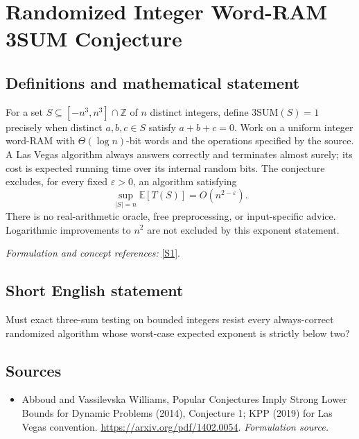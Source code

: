 \documentclass[11pt]{article}
\begin{document}
\section*{\texorpdfstring{Randomized Integer Word-RAM 3SUM Conjecture}{Randomized Integer Word-RAM 3SUM Conjecture}}\label{statement}
\subsection{Definitions and mathematical statement}
For a set $S\subseteq[-n^3,n^3]\cap{\mathbb{Z}}$ of $n$ distinct integers, define
$\mathrm{3SUM}(S)=1$ precisely when distinct $a,b,c\in S$ satisfy $a+b+c=0$. Work on a uniform integer word-RAM with $\Theta(\log n)$-bit words and the operations specified by the source. A Las Vegas algorithm always answers correctly and terminates almost surely; its cost is expected running time over its internal random bits. The conjecture excludes, for every fixed ${\varepsilon}>0$, an algorithm satisfying
\[
 \sup_{|S|=n}{\mathbb{E}}[T(S)]=O(n^{2-{\varepsilon}}).
\]
There is no real-arithmetic oracle, free preprocessing, or input-specific advice. Logarithmic improvements to $n^2$ are not excluded by this exponent statement.
\par\smallskip\textit{Formulation and concept references:} \href{https://arxiv.org/pdf/1402.0054}{[S1]}.

\subsection{Short English statement}
Must exact three-sum testing on bounded integers resist every always-correct randomized algorithm whose worst-case expected exponent is strictly below two?
\subsection{Sources}
\begin{itemize}
\item[S1]Abboud and Vassilevska Williams, Popular Conjectures Imply Strong Lower Bounds for Dynamic Problems (2014), Conjecture 1; KPP (2019) for Las Vegas convention.
\url{https://arxiv.org/pdf/1402.0054}.
\textit{Formulation source.}
\end{itemize}
\end{document}
